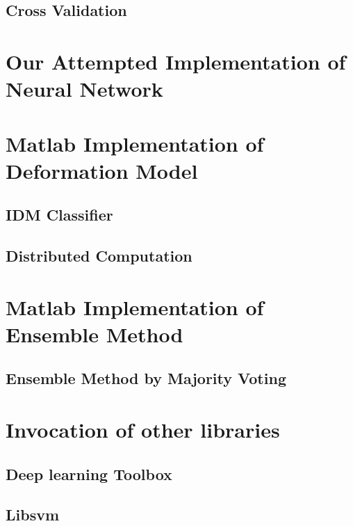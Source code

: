 \documentclass{article} %
\begin{document}
\subsection{Cross Validation}

\newpage

\section{Our Attempted Implementation of Neural Network}

\newpage


\section{Matlab Implementation of Deformation Model}
\subsection{IDM Classifier}

\newpage
\subsection{Distributed Computation}

\newpage

\section{Matlab Implementation of Ensemble Method}
\subsection{Ensemble Method by Majority Voting}


\newpage
\section{Invocation of other libraries}
\subsection{Deep learning Toolbox}

\subsection{Libsvm}

\end{document}
